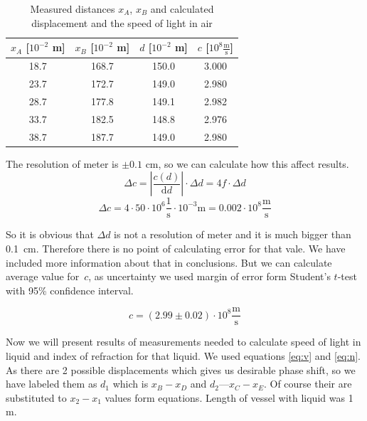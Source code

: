 \documentclass[a4paper,12pt]{article}
\begin{document}
    \begin{table}[h]
        \begin{center}
            \caption{Measured distances $x_A$, $x_B$ and calculated displacement and the speed of light in air}
            \label{tab:c}
            \begin{tabular}{|c|c|c|c|}
                \hline
                $x_A$ [$10^{-2}$ m] & $x_B$ [$10^{-2}$ m] & $d$ [$10^{-2}$ m] & $c$ [$10^8 \frac{\mathrm m}{\mathrm s}$] \\ 
                \hline
                18.7 & 168.7 & 150.0 & 3.000\\
                23.7 & 172.7 & 149.0 & 2.980\\
                28.7 & 177.8 & 149.1 & 2.982\\
                33.7 & 182.5 & 148.8 & 2.976\\
                38.7 & 187.7 & 149.0 & 2.980\\
                \hline
            \end{tabular}
        \end{center}
    \end{table}

    The resolution of meter is $\pm 0.1$ cm, so we can calculate how this affect results.
    \begin{equation}
        \Delta c = \left| \frac{c(d)}{\mathrm{d} d}\right| \cdot \Delta d = 4 f \cdot \Delta d
    \end{equation}
    \begin{displaymath}
        \Delta c = 4 \cdot 50 \cdot 10^6 \frac{1}{\mathrm{s}} \cdot 10^{-3} \mathrm{m} = 0.002 \cdot 10^8 \frac{\mathrm{m}}{\mathrm{s}}
    \end{displaymath}

    So it is obvious that $\Delta d$ is not a resolution of meter and it is much bigger than 0.1~cm. Therefore there is no point of calculating error for that vale. We have included more information about that in conclusions. But we can calculate average value for~$c$, as uncertainty we used margin of error form Student's $t$-test with 95\% confidence interval.

    \begin{displaymath}
        c = (2.99\pm0.02) \cdot 10^8 \frac{\mathrm m}{\mathrm s}
    \end{displaymath}
    
    Now we will present results of measurements needed to calculate speed of light in liquid and index of refraction for that liquid. We used equations \ref{eq:v} and \ref{eq:n}. As there are 2 possible displacements which gives us desirable phase shift, so we have labeled them as $d_1$ which is $x_B - x_D$ and $d_2$---$x_C - x_E$. Of course their are substituted to $x_2 - x_1$ values form equations.   
    Length of vessel with liquid was 1 m. 
\end{document}
